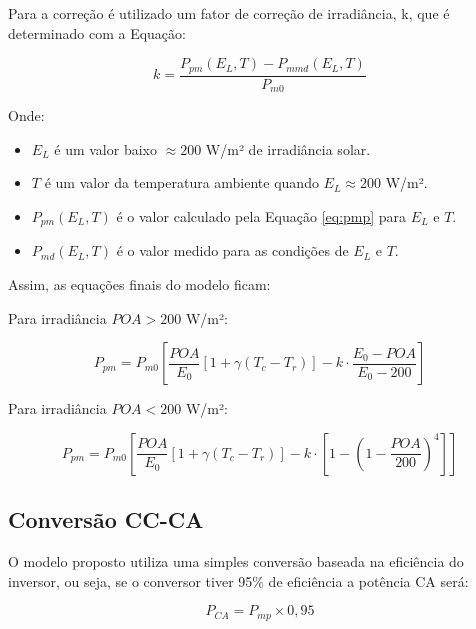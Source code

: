 Para a correção é utilizado um fator de correção de irradiância, k, que é determinado com a Equação:

\begin{equation}
    k = \frac{P_{pm}(E_L,T) - P_{mmd}(E_L,T)}{P_{m0}}
    \label{eq:ke}
\end{equation}

Onde:

\begin{itemize}
  \item $E_L$ é um valor baixo $\approx 200$ W/m² de irradiância solar.
  
  \item $T$ é um valor da temperatura ambiente quando $ E_L \approx 200$ W/m².

  \item $P_{pm}(E_L,T)$ é o valor calculado pela Equação \ref{eq:pmp} para $E_L$ e $T$.
  
  \item $P_{md}(E_L,T)$ é o valor medido para as condições de $E_L$ e $T$.
\end{itemize}

Assim, as equações finais do modelo ficam:
\newline

Para irradiância $POA > 200$ W/m²:

\begin{equation}
    P_{pm} = P_{m0} [ \frac{POA}{E_0} [1 + \gamma(T_c - T_r)] - k \cdot \frac{E_0 - POA}{E_0 - 200}]
    \label{eq:pmp3}
\end{equation}

Para irradiância $POA < 200$ W/m²:

\begin{equation}
    P_{pm} = P_{m0} [ \frac{POA}{E_0} [1 + \gamma(T_c - T_r)] - k \cdot [1 - (1 - \frac{POA}{200})^4]]
    \label{eq:pmp4}
\end{equation}

\subsection{Conversão CC-CA}

O modelo proposto utiliza uma simples conversão baseada na eficiência do inversor, ou seja, se o conversor tiver 95\% de eficiência a potência CA será:

\begin{equation}
    P_{CA} = P_{mp} \times 0,95
    \label{eq:pca}
\end{equation}

